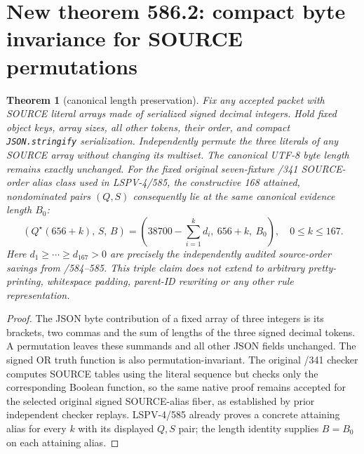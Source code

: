 \documentclass[11pt]{article}
\newtheorem{theorem}{Theorem}
\begin{document}
\section*{New theorem 586.2: compact byte invariance for SOURCE permutations}
\begin{theorem}[canonical length preservation]
Fix any accepted packet with SOURCE literal arrays made of serialized signed decimal integers. Hold fixed object keys, array sizes, all other tokens, their order, and compact \texttt{JSON.stringify} serialization. Independently permute the three literals of any SOURCE array without changing its multiset. The canonical UTF-8 byte length remains \emph{exactly unchanged}. For the fixed original seven-fixture /341 SOURCE-order alias class used in LSPV-4/585, the constructive 168 attained, nondominated pairs $(Q,S)$ consequently lie at the same canonical evidence length $B_0$:
\[
\boxed{(Q^\star(656+k),\,S,\,B)
=\left(38700-\sum_{i=1}^k d_i,\ 656+k,\ B_0\right),
\quad 0\leq k\leq167.}
\]
Here $d_1\geq\cdots\geq d_{167}>0$ are precisely the independently audited source-order savings from /584--585. This triple claim does \emph{not} extend to arbitrary pretty-printing, whitespace padding, parent-ID rewriting or any other rule representation.
\end{theorem}
\begin{proof}
The JSON byte contribution of a fixed array of three integers is its brackets, two commas and the sum of lengths of the three signed decimal tokens. A permutation leaves these summands and all other JSON fields unchanged. The signed OR truth function is also permutation-invariant. The original /341 checker computes SOURCE tables using the literal sequence but checks only the corresponding Boolean function, so the same native proof remains accepted for the selected original signed SOURCE-alias fiber, as established by prior independent checker replays. LSPV-4/585 already proves a concrete attaining alias for every $k$ with its displayed $Q,S$ pair; the length identity supplies $B=B_0$ on each attaining alias. \end{proof}
\end{document}
